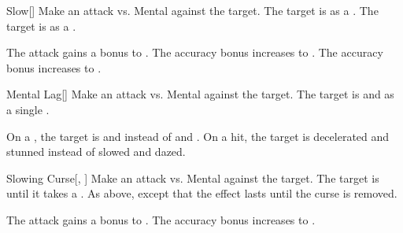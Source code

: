 \lowercase{\hypertarget{spell:Slow}{}}\label{spell:Slow}
\begin{freeability}[Rank 1]{\hypertarget{spell:Slow}{Slow}}[]
Make an attack vs. Mental against the target.
\hit The target is  as a .
\crit The target is  as a .

\rankline
{} The attack gains a  bonus to .
 The accuracy bonus increases to .
 The accuracy bonus increases to .
\end{freeability}
\vspace{0.25em}



\lowercase{\hypertarget{spell:Mental Lag}{}}\label{spell:Mental Lag}
\begin{freeability}[Rank 3]{\hypertarget{spell:Mental Lag}{Mental Lag}}[]
Make an attack vs. Mental against the target.
\hit The target is  and  as a single .

\rankline
{} On a , the target is  and  instead of  and .
 On a hit, the target is decelerated and stunned instead of slowed and dazed.
\end{freeability}
\vspace{0.25em}



\lowercase{\hypertarget{spell:Slowing Curse}{}}\label{spell:Slowing Curse}
\begin{freeability}[Rank 3]{\hypertarget{spell:Slowing Curse}{Slowing Curse}}[, ]
Make an attack vs. Mental against the target.
\hit The target is  until it takes a .
\crit As above, except that the effect lasts until the curse is removed.

\rankline
{} The attack gains a  bonus to .
 The accuracy bonus increases to .
\end{freeability}
\vspace{0.25em}



